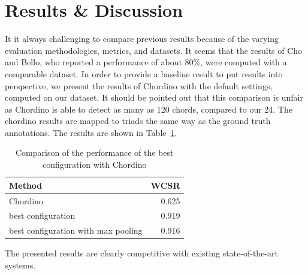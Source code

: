 \documentclass{article}
\begin{document}
\section{Results \& Discussion}
It it always challenging to compare previous results because of the varying evaluation methodologies, metrics, and datasets. It seems that the results of Cho and Bello, who reported a performance of about 80\%, were computed with a comparable dataset. In order to provide a baseline result to put results into perspective, we present the results of Chordino \cite{mauch2010approximate} with the default settings, computed on our dataset. It should be pointed out that this comparison is unfair as Chordino is able to detect as many as 120 chords, compared to our 24. The chordino results are mapped to triads the same way as the ground truth annotations. The results are shown in Table~\ref{tab: final}. 
\begin{table}
\centering
\begin{tabular*}{\columnwidth}{@{\extracolsep{\fill}}lr}
\toprule
\textbf{Method}   &  \textbf{WCSR}   \\ \midrule
Chordino & 0.625       \\
best configuration &  0.919   \\ 
best configuration with max pooling & 0.916 \\ \bottomrule
\end{tabular*}
\caption{Comparison of the performance of the best configuration with Chordino}
\label{tab: final}
\end{table}
The presented results are clearly competitive with existing state-of-the-art systems.

\end{document}
